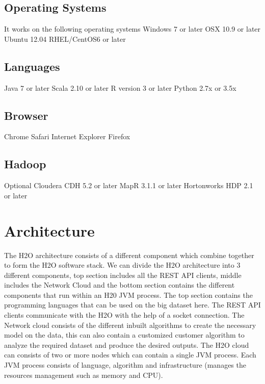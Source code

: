 \documentclass[9pt,twocolumn,twoside]{styles/osajnl}
\begin{document}
\subsection{Operating Systems}
\cite{www-h2o-requirements}
It works on the following operating systems 
\newline Windows 7 or later
\newline OSX 10.9 or later
\newline Ubuntu 12.04
\newline RHEL/CentOS6 or later

\subsection{Languages}

 Java 7 or later
\newline Scala 2.10 or later
\newline R version 3 or later
\newline Python 2.7x or 3.5x
 
\subsection{Browser}

 Chrome
\newline Safari
\newline Internet Explorer
\newline Firefox

\subsection{Hadoop}
 Optional Cloudera CDH 5.2 or later
\newline MapR 3.1.1 or later
\newline Hortonworks HDP 2.1 or later

\section{Architecture}
\cite{www-h2o-architecture}
The H2O architecture consists of a different component which combine
together to form the H2O software stack. We can divide the H2O
architecture into 3 different components, top section includes all
the REST API clients, middle includes the Network Cloud and the
bottom section contains the different components that run within an
H20 JVM process. The top section contains the programming languages
that can be used on the big dataset here. The REST API clients
communicate with the H2O with the help of a socket connection. The
Network cloud consists of the different inbuilt algorithms to create
the necessary model on the data, this can also contain a customized
customer algorithm to analyze the required dataset and produce the
desired outputs.  The H2O cloud can consists of two or more nodes
which can contain a single JVM process. Each JVM process consists of
language, algorithm and infrastructure (manages the resources
management such as memory and CPU).
\end{document}
